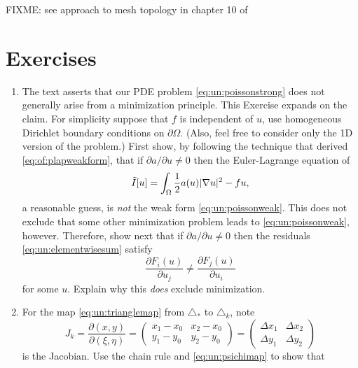 FIXME: see approach to mesh topology in chapter 10 of \citep{Loggetal2012}


\section{Exercises}

\renewcommand{\labelenumi}{\arabic{chapter}.\arabic{enumi}\quad}
\renewcommand{\labelenumii}{(\alph{enumii})}
\begin{enumerate}
\item \label{exer:un:notminimization}  The text asserts that our PDE problem \eqref{eq:un:poissonstrong} does not generally arise from a minimization principle.  This Exercise expands on the claim.  For simplicity suppose that $f$ is independent of $u$, use homogeneous Dirichlet boundary conditions on $\partial \Omega$.  (Also, feel free to consider only the 1D version of the problem.)  First show, by following the technique that derived \eqref{eq:of:plapweakform}, that if $\partial a/\partial u \ne 0$ then the Euler-Lagrange equation of
\begin{equation}
  \tilde I[u] = \int_\Omega \frac{1}{2} a(u) |\nabla u|^2 - f u,  \label{eq:un:nottheobjective}
\end{equation}
a reasonable guess, is \emph{not} the weak form \eqref{eq:un:poissonweak}.  This does not exclude that some other minimization problem leads to \eqref{eq:un:poissonweak}, however.  Therefore, show next that if $\partial a/\partial u \ne 0$ then the residuals \eqref{eq:un:elementwisesum} satisfy
\begin{equation}
  \frac{\partial F_i(u)}{\partial u_j} \ne \frac{\partial F_j(u)}{\partial u_i} \label{eq:un:symmetryresidualsdonthave}
\end{equation}
for some $u$.  Explain why this \emph{does} exclude minimization.
\item  \label{exer:un:gradientdetails}  For the map \eqref{eq:un:trianglemap} from $\triangle_\ast$ to $\triangle_k$, note
    $$J_k = \frac{\partial (x,y)}{\partial (\xi,\eta)} = \begin{pmatrix}
    x_1 - x_0 & x_2 - x_0 \\
    y_1 - y_0 & y_2 - y_0 \end{pmatrix}
    = \begin{pmatrix}
    \Delta x_1 & \Delta x_2 \\
    \Delta y_1 & \Delta y_2
    \end{pmatrix}$$
is the Jacobian.  Use the chain rule and \eqref{eq:un:psichimap} to show that

\end{enumerate}
